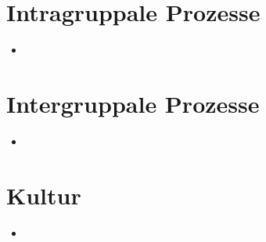\documentclass[11pt, paper=a4, twocolumn]{scrartcl}
\begin{document}
	\section{Intragruppale Prozesse}
		\begin{itemize}
			\item
		\end{itemize}


	\section{Intergruppale Prozesse}
		\begin{itemize}
			\item
		\end{itemize}


	\section{Kultur}
		\begin{itemize}
			\item
		\end{itemize}
\end{document}
